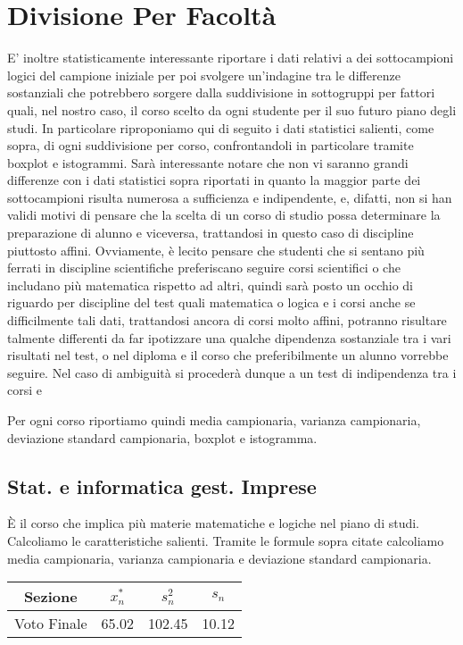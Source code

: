 \section{Divisione Per Facoltà}

E’ inoltre statisticamente interessante riportare i dati relativi a dei sottocampioni logici del campione iniziale per poi svolgere un’indagine tra le differenze sostanziali che potrebbero sorgere dalla suddivisione in sottogruppi per fattori quali, nel nostro caso, il corso scelto da ogni studente per il suo futuro piano degli studi.  In particolare riproponiamo qui di seguito i dati statistici salienti, come sopra, di ogni suddivisione per corso, confrontandoli in particolare tramite boxplot e istogrammi. Sarà interessante notare che non vi saranno grandi differenze con i dati statistici sopra riportati in quanto la maggior parte dei sottocampioni risulta numerosa a sufficienza e indipendente, e, difatti, non si han validi motivi di pensare che la scelta di un corso di studio possa determinare la preparazione di alunno e  viceversa, trattandosi in questo caso di discipline piuttosto affini. Ovviamente, è lecito pensare che studenti che si sentano più ferrati in discipline scientifiche preferiscano seguire corsi scientifici o che includano più matematica rispetto ad altri, quindi sarà posto un occhio di riguardo per discipline del test quali matematica o logica e i corsi anche se difficilmente tali dati, trattandosi ancora di corsi molto affini, potranno risultare talmente differenti da far ipotizzare una qualche dipendenza sostanziale tra i vari risultati nel test, o nel diploma e il corso che preferibilmente un alunno vorrebbe seguire.  Nel caso di ambiguità si procederà dunque a un test di indipendenza tra i corsi e 

Per ogni corso riportiamo quindi media campionaria, varianza campionaria, deviazione standard campionaria, boxplot e istogramma.
\clearpage
\thispagestyle{empty} %
\subsection{Stat. e informatica gest. Imprese}

È il corso che implica più materie matematiche e logiche  nel piano di studi.
Calcoliamo le caratteristiche salienti.
Tramite le formule sopra citate calcoliamo media campionaria, varianza campionaria e deviazione standard campionaria.

\begin{center}
\begin{tabular}{|c|c|c|c|}
  \hline
  Sezione & \(x_{n}^{*}\) & \(s_n^2\) & \(s_n\) \\
  \hline
  Voto Finale & 65.02 & 102.45 & 10.12 \\
  \hline
\end{tabular}
\end{center}

